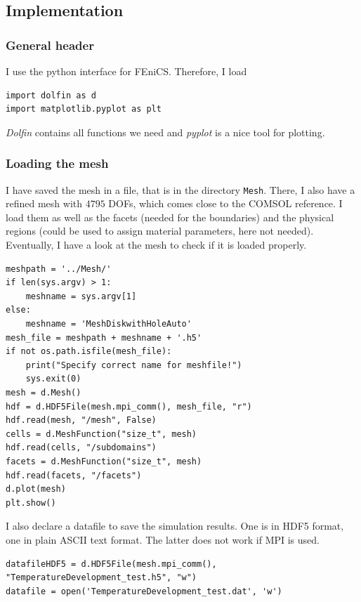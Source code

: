 \documentclass{article}
\begin{document}
\subsection{Implementation}
\subsubsection{General header}
I use the python interface for FEniCS.
Therefore, I load 
\begin{lstlisting}
import dolfin as d
import matplotlib.pyplot as plt
\end{lstlisting}
\textit{Dolfin} contains all functions we need and \textit{pyplot} is a nice tool for plotting.
\subsubsection{Loading the mesh}
I have saved the mesh in a file, that is in the directory \texttt{Mesh}. 
There, I also have a refined mesh with $4795$ DOFs, which comes close to the COMSOL reference. 
I load them as well as the facets (needed for the boundaries) and the physical regions (could be used to assign material parameters, here not needed). 
Eventually, I have a look at the mesh to check if it is loaded properly.
\begin{lstlisting}
meshpath = '../Mesh/'
if len(sys.argv) > 1:
    meshname = sys.argv[1]
else:
    meshname = 'MeshDiskwithHoleAuto'
mesh_file = meshpath + meshname + '.h5'
if not os.path.isfile(mesh_file):
    print("Specify correct name for meshfile!")
    sys.exit(0)
mesh = d.Mesh()
hdf = d.HDF5File(mesh.mpi_comm(), mesh_file, "r")
hdf.read(mesh, "/mesh", False)
cells = d.MeshFunction("size_t", mesh)
hdf.read(cells, "/subdomains")
facets = d.MeshFunction("size_t", mesh)
hdf.read(facets, "/facets")
d.plot(mesh)
plt.show()
\end{lstlisting}
I also declare a datafile to save the simulation results.
One is in HDF5 format, one in plain ASCII text format.
The latter does not work if MPI is used.
\begin{lstlisting}
datafileHDF5 = d.HDF5File(mesh.mpi_comm(), "TemperatureDevelopment_test.h5", "w")
datafile = open('TemperatureDevelopment_test.dat', 'w')
\end{lstlisting}
\end{document}

